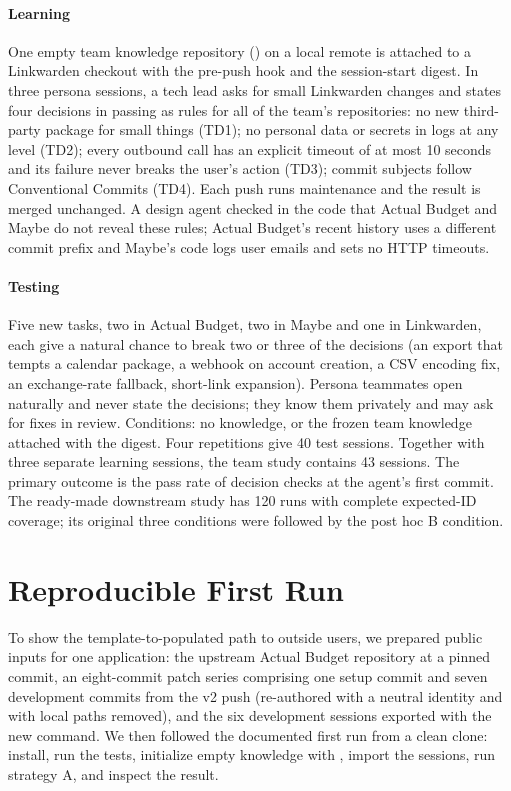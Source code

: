 \paragraph{Learning} One empty team knowledge repository () on a local remote is attached to a Linkwarden checkout with the pre-push hook and the session-start digest. In three persona sessions, a tech lead asks for small Linkwarden changes and states four decisions in passing as rules for all of the team's repositories: no new third-party package for small things (TD1); no personal data or secrets in logs at any level (TD2); every outbound call has an explicit timeout of at most 10 seconds and its failure never breaks the user's action (TD3); commit subjects follow Conventional Commits (TD4). Each push runs maintenance and the result is merged unchanged. A design agent checked in the code that Actual Budget and Maybe do not reveal these rules; Actual Budget's recent history uses a different commit prefix and Maybe's code logs user emails and sets no HTTP timeouts.

\paragraph{Testing} Five new tasks, two in Actual Budget, two in Maybe and one in Linkwarden, each give a natural chance to break two or three of the decisions (an  export that tempts a calendar package, a webhook on account creation, a CSV encoding fix, an exchange-rate fallback, short-link expansion). Persona teammates open naturally and never state the decisions; they know them privately and may ask for fixes in review. Conditions: no knowledge, or the frozen team knowledge attached with the digest. Four repetitions give 40 test sessions. Together with three separate learning sessions, the team study contains 43 sessions. The primary outcome is the pass rate of decision checks at the agent's first commit. The ready-made downstream study has 120 runs with complete expected-ID coverage; its original three conditions were followed by the post hoc B condition.

\section{Reproducible First Run}

To show the template-to-populated path to outside users, we prepared public inputs for one application: the upstream Actual Budget repository at a pinned commit, an eight-commit patch series comprising one setup commit and seven development commits from the v2 push (re-authored with a neutral identity and with local paths removed), and the six development sessions exported with the new  command. We then followed the documented first run from a clean clone: install, run the tests, initialize empty knowledge with , import the sessions, run strategy A, and inspect the result.
